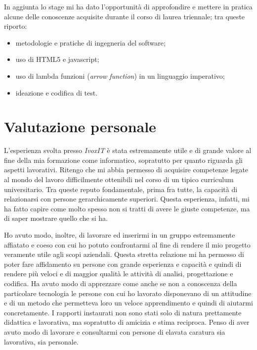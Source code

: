 In aggiunta lo stage mi ha dato l'opportunità di approfondire e mettere in pratica alcune delle conoscenze acquisite durante il corso di laurea triennale; tra queste riporto:
\begin{itemize}
    \item metodologie e pratiche di ingegneria del software;
    \item uso di HTML5 e javascript;
    \item uso di lambda funzioni (\emph{arrow function}) in un linguaggio imperativo;
    \item ideazione e codifica di test.
\end{itemize}


\section{Valutazione personale}
L'esperienza svolta presso \emph{IvoxIT} è stata estremamente utile e di grande valore al fine della mia formazione come informatico, sopratutto per quanto riguarda gli aspetti lavorativi. Ritengo che mi abbia permesso di acquisire competenze legate al mondo del lavoro difficilmente ottenibili nel corso di un tipico curriculum universitario. Tra queste reputo fondamentale, prima fra tutte, la capacità di relazionarsi con persone gerarchicamente superiori. Questa esperienza, infatti, mi ha fatto capire come molto spesso non si tratti di avere le giuste competenze, ma di saper mostrare quello che si ha.

Ho avuto modo, inoltre, di lavorare ed inserirmi in un gruppo estremamente affiatato e coeso con cui ho potuto confrontarmi al fine di rendere il mio progetto veramente utile agli scopi aziendali. Questa stretta relazione mi ha permesso di poter fare affidamento su persone con grande esperienza e capacità e quindi di rendere più veloci e di maggior qualità le attività di analisi, progettazione e codifica. Ha avuto modo di apprezzare come anche se non a conoscenza della particolare tecnologia le persone con cui ho lavorato disponevano di un attitudine e di un metodo che permetteva loro un veloce apprendimento e quindi di aiutarmi concretamente. I rapporti instaurati non sono stati solo di natura prettamente didattica e lavorativa, ma sopratutto di amicizia e stima reciproca. Penso di aver avuto modo di lavorare e consultarmi con persone di elavata caratura sia lavorativa, sia personale. 

